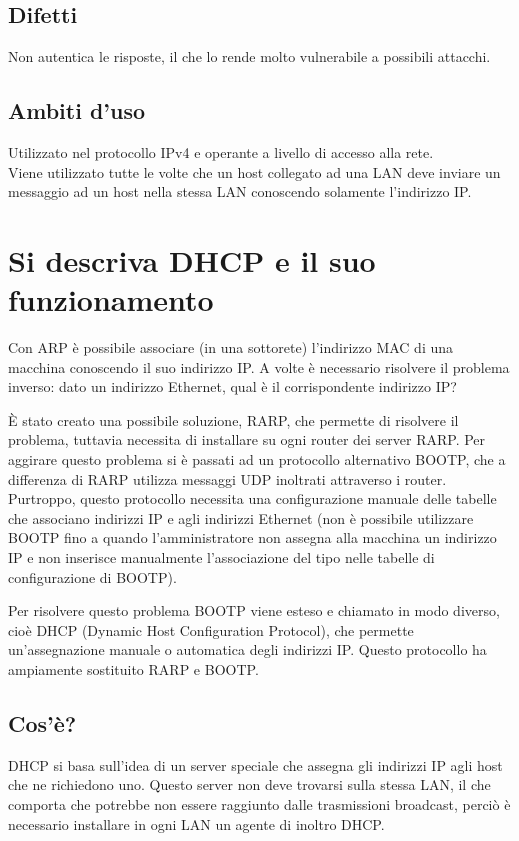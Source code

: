 \subsection{Difetti}
Non autentica le risposte, il che lo rende molto vulnerabile a possibili attacchi.

\subsection{Ambiti d'uso}
Utilizzato nel protocollo IPv4 e operante a livello di accesso alla rete. \\
Viene utilizzato tutte le volte che un host collegato ad una LAN deve inviare un messaggio ad un host nella stessa LAN conoscendo solamente l'indirizzo IP.

\section{Si descriva DHCP e il suo funzionamento}

Con ARP è possibile associare (in una sottorete) l'indirizzo MAC di una macchina conoscendo il suo indirizzo IP.
A volte è necessario risolvere il problema inverso: dato un indirizzo Ethernet, qual è il corrispondente indirizzo IP?

È stato creato una possibile soluzione, RARP, che permette di risolvere il problema, tuttavia necessita di installare su ogni router dei server RARP. Per aggirare questo problema si è passati ad un protocollo alternativo BOOTP, che a differenza di RARP utilizza messaggi UDP inoltrati attraverso i router. Purtroppo, questo protocollo necessita una configurazione manuale delle tabelle che associano indirizzi IP e agli indirizzi Ethernet (non è possibile utilizzare BOOTP fino a quando l'amministratore non assegna alla macchina un indirizzo IP e non inserisce manualmente l'associazione del tipo nelle tabelle di configurazione di BOOTP).

Per risolvere questo problema BOOTP viene esteso e chiamato in modo diverso, cioè DHCP (Dynamic Host Configuration Protocol), che permette un'assegnazione manuale o automatica degli indirizzi IP.
Questo protocollo ha ampiamente sostituito RARP e BOOTP.

\subsection{Cos'è?}
DHCP si basa sull'idea di un server speciale che assegna gli indirizzi IP agli host che ne richiedono uno.
Questo server non deve trovarsi sulla stessa LAN, il che comporta che potrebbe non essere raggiunto dalle trasmissioni broadcast, perciò è necessario installare in ogni LAN un agente di inoltro DHCP.

